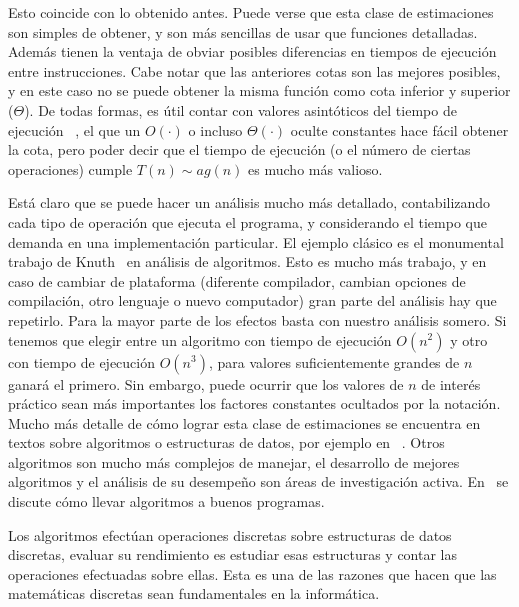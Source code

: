   Esto coincide con lo obtenido antes.
  Puede verse que esta clase de estimaciones son simples de obtener,
  y son más sencillas de usar que funciones detalladas.
  Además tienen la ventaja de obviar posibles diferencias
  en tiempos de ejecución entre instrucciones.
  Cabe notar que las anteriores cotas son las mejores posibles,
  y en este caso no se puede obtener
  la misma función como cota inferior y superior
  (\(\Theta\)).
  De todas formas,
  es útil contar con valores asintóticos del tiempo de ejecución~%
    \cite{sedgewick13:_introd_anal_algor},
  el que un \(O(\cdot)\)
  o incluso \(\Theta(\cdot)\) oculte constantes
  hace fácil obtener la cota,
  pero poder decir que el tiempo de ejecución
  (o el número de ciertas operaciones)
  cumple \(T(n) \sim a g(n)\) es mucho más valioso.

  Está claro que se puede hacer un análisis mucho más detallado,
  contabilizando cada tipo de operación que ejecuta el programa,
  y considerando el tiempo que demanda
  en una implementación particular.%
  El ejemplo clásico es el monumental trabajo de Knuth~%
    \cite{knuth97:_fundam_algor,
	  knuth97:_semin_algor,
	  knuth98:_sortin_searc,
	  knuth11:_combin_alg_1}
  en análisis de algoritmos.
  Esto es mucho más trabajo,
  y en caso de cambiar de plataforma
  (diferente compilador,
   cambian opciones de compilación,
   otro lenguaje o nuevo computador)
  gran parte del análisis hay que repetirlo.
  Para la mayor parte de los efectos
  basta con nuestro análisis somero.
  Si tenemos que elegir entre un algoritmo
  con tiempo de ejecución \(O(n^2)\)
  y otro con tiempo de ejecución \(O(n^3)\),
  para valores suficientemente grandes de \(n\) ganará el primero.
  Sin embargo,
  puede ocurrir que los valores de \(n\) de interés práctico
  sean más importantes
  los factores constantes ocultados por la notación.
  Mucho más detalle de cómo lograr esta clase de estimaciones
  se encuentra en textos sobre algoritmos o estructuras de datos,
  por ejemplo en~%
    \cite{aho74:_design_anal_comp_algor,
	  cormen09:_introd_algor,
	  sedgewick13:_introd_anal_algor,
	  skiena08:_algor_desig_manual}.
  Otros algoritmos son mucho más complejos de manejar,
  el desarrollo de mejores algoritmos y el análisis de su desempeño
  son áreas de investigación activa.
  En~%
     \cite{bentley82:_writing_efficent_programs,
	   bentley00:_progr_pearl,
	   kernighan99:_practice_progr}
  se discute cómo llevar algoritmos a buenos programas.

  Los algoritmos efectúan operaciones discretas
  sobre estructuras de datos discretas,
  evaluar su rendimiento es estudiar esas estructuras
  y contar las operaciones efectuadas sobre ellas.
  Esta es una de las razones que hacen que las matemáticas discretas
  sean fundamentales en la informática.

